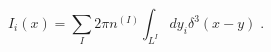 \begin{equation}
I_{i}(x)=\sum_{I}2\pi n^{(I)}\int_{L^{I}}dy_{i}\delta ^{3}(x-y)\;.
\label{ci}
\end{equation}

